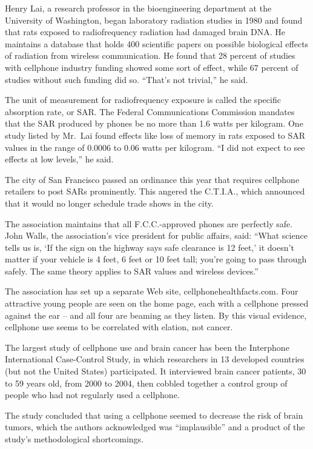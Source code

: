 ﻿\documentclass[12pt]{article}
\begin{document}
Henry Lai, a research professor in the bioengineering department at the University of Washington,
began laboratory radiation studies in 1980 and found that rats exposed to radiofrequency radiation
had damaged brain DNA. He maintains a database that holds 400 scientific papers on possible
biological effects of radiation from wireless communication. He found that 28 percent of studies
with cellphone industry funding showed some sort of effect, while 67 percent of studies without such
funding did so. ``That's not trivial,'' he said.

The unit of measurement for radiofrequency exposure is called the specific absorption rate, or SAR.
The Federal Communications Commission mandates that the SAR produced by phones be no more than 1.6
watts per kilogram. One study listed by Mr.~Lai found effects like loss of memory in rats exposed to
SAR values in the range of 0.0006 to 0.06 watts per kilogram. ``I did not expect to see effects at
low levels,'' he said.

The city of San Francisco passed an ordinance this year that requires cellphone retailers to post
SARs prominently. This angered the C.T.I.A., which announced that it would no longer schedule trade
shows in the city.

The association maintains that all F.C.C.-approved phones are perfectly safe. John Walls, the
association's vice president for public affairs, said: ``What science tells us is, `If the sign on
the highway says safe clearance is 12 feet,' it doesn't matter if your vehicle is 4 feet, 6 feet or
10 feet tall; you're going to pass through safely. The same theory applies to SAR values and
wireless devices.''

The association has set up a separate Web site, cellphonehealthfacts.com. Four attractive young
people are seen on the home page, each with a cellphone pressed against the ear -- and all four are
beaming as they listen. By this visual evidence, cellphone use seems to be correlated with elation,
not cancer.

The largest study of cellphone use and brain cancer has been the Interphone International
Case-Control Study, in which researchers in 13 developed countries (but not the United States)
participated. It interviewed brain cancer patients, 30 to 59 years old, from 2000 to 2004, then
cobbled together a control group of people who had not regularly used a cellphone.

The study concluded that using a cellphone seemed to decrease the risk of brain tumors, which the
authors acknowledged was ``implausible'' and a product of the study's methodological shortcomings.
\end{document}
